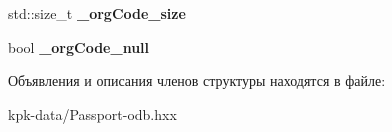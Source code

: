 \begin{DoxyCompactItemize}
\item 
std\+::size\+\_\+t {\bfseries \+\_\+org\+Code\+\_\+size}\hypertarget{structodb_1_1access_1_1composite__value__traits_3_01_1_1kpk_1_1data_1_1_passport_00_01id__pgsql_01_4_1_1image__type_af2682d74bcdcda2c0ad134df587a2bad}{}\label{structodb_1_1access_1_1composite__value__traits_3_01_1_1kpk_1_1data_1_1_passport_00_01id__pgsql_01_4_1_1image__type_af2682d74bcdcda2c0ad134df587a2bad}

\item 
bool {\bfseries \+\_\+org\+Code\+\_\+null}\hypertarget{structodb_1_1access_1_1composite__value__traits_3_01_1_1kpk_1_1data_1_1_passport_00_01id__pgsql_01_4_1_1image__type_abbab06d6ed55e11d92936e7a3e20993b}{}\label{structodb_1_1access_1_1composite__value__traits_3_01_1_1kpk_1_1data_1_1_passport_00_01id__pgsql_01_4_1_1image__type_abbab06d6ed55e11d92936e7a3e20993b}

\end{DoxyCompactItemize}


Объявления и описания членов структуры находятся в файле\+:\begin{DoxyCompactItemize}
\item 
kpk-\/data/Passport-\/odb.\+hxx\end{DoxyCompactItemize}
